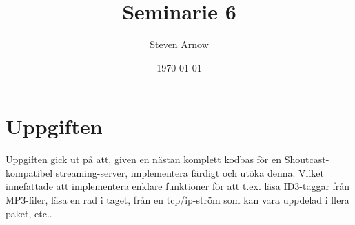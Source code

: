 \documentclass[a4paper, 11pt]{article}
\title{Seminarie 6}
\author{Steven Arnow}
\date{\today}
\begin{document}
\maketitle





\section{Uppgiften}

Uppgiften gick ut på att, given en nästan komplett kodbas för en Shoutcast-kompatibel streaming-server, implementera färdigt och utöka denna. Vilket innefattade att implementera enklare funktioner för att t.ex. läsa ID3-taggar från MP3-filer, läsa en rad i taget, från en tcp/ip-ström som kan vara uppdelad i flera paket, etc..
\end{document}
